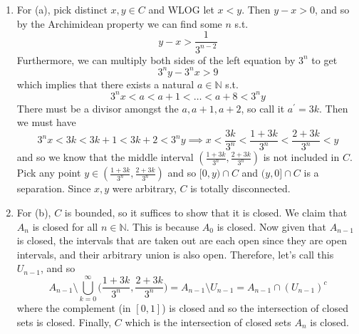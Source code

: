   \begin{solution}
    \begin{enumerate}
      \item For (a), pick distinct $x, y \in C$ and WLOG let $x < y$. Then $y - x > 0$, and so by the Archimidean property we can find some $n$ s.t. 
      \begin{equation}
        y - x > \frac{1}{3^{n-2}} 
      \end{equation} 
      Furthermore, we can multiply both sides of the left equation by $3^n$ to get 
      \begin{equation}
        3^n y - 3^n x > 9
      \end{equation}
      which implies that there exists a natural $a \in \mathbb{N}$ s.t. 
      \begin{equation}
        3^n x < a < a + 1 < \ldots < a + 8 < 3^n y 
      \end{equation}
      There must be a divisor amongst the $a, a + 1, a + 2$, so call it $a^\prime = 3k$. Then we must have 
      \begin{equation}
        3^n x < 3k < 3k + 1 < 3k + 2 < 3^n y \implies x < \frac{3k}{3^n} < \frac{1 + 3k}{3^n} < \frac{2 + 3k}{3^n} < y
      \end{equation} 
      and so we know that the middle interval $(\frac{1 + 3k}{3^n}, \frac{2 + 3k}{3^n})$ is not included in $C$. Pick any point $y \in (\frac{1 + 3k}{3^n}, \frac{2 + 3k}{3^n})$ and so $[0, y) \cap C$ and $(y, 0] \cap C$ is a separation. Since $x, y$ were arbitrary, $C$ is totally disconnected. 

      \item For (b), $C$ is bounded, so it suffices to show that it is closed. We claim that $A_n$ is closed for all $n \in \mathbb{N}$. This is because $A_0$ is closed. Now given that $A_{n-1}$ is closed, the intervals that are taken out are each open since they are open intervals, and their arbitrary union is also open. Therefore, let's call this $U_{n-1}$, and so 
      \begin{equation}
        A_{n-1} \setminus \bigcup_{k=0}^\infty \bigg( \frac{1 + 3k}{3^n}, \frac{2 + 3k}{3^n} \bigg) = A_{n-1} \setminus U_{n-1} = A_{n-1} \cap (U_{n-1})^c 
      \end{equation} 
      where the complement (in $[0, 1]$) is closed and so the intersection of closed sets is closed. Finally, $C$ which is the intersection of closed sets $A_n$ is closed. 


\end{enumerate}
\end{solution}
